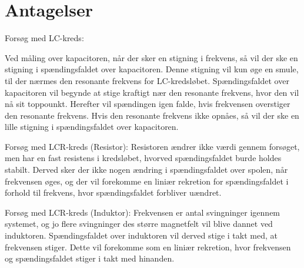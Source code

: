 \section{Antagelser}

Forsøg med LC-kreds:

Ved måling over kapacitoren, når der sker en stigning i frekvens, så vil der ske en stigning i spændingsfaldet over kapacitoren. Denne stigning vil kun øge en smule, til der nærmes den resonante frekvens for LC-kredsløbet. Spændingsfaldet over kapacitoren vil begynde at stige kraftigt nær den resonante frekvens, hvor den vil nå sit toppounkt. Herefter vil spændingen igen falde, hvis frekvensen overstiger den resonante frekvens. Hvis den resonante frekvens ikke opnåes, så vil der ske en lille stigning i spændingsfaldet over kapacitoren.

Forsøg med LCR-kreds (Resistor):
Resistoren ændrer ikke værdi gennem forsøget, men har en fast resistens i kredsløbet, hvorved spændingsfaldet burde holdes stabilt. Derved sker der ikke nogen ændring i spændingsfaldet over spolen, når frekvensen øges, og der vil forekomme en liniær rekretion for spændingsfaldet i forhold til frekvens, hvor spændingsfaldet forbliver uændret.

Forsøg med LCR-kreds (Induktor):
Frekvensen er antal svingninger igennem systemet, og jo flere svingninger des større magnetfelt vil blive dannet ved induktoren. Spændingsfaldet over induktoren vil derved stige i takt med, at frekvensen stiger. Dette vil forekomme som en liniær rekretion, hvor frekvensen og spændingsfaldet stiger i takt med hinanden.